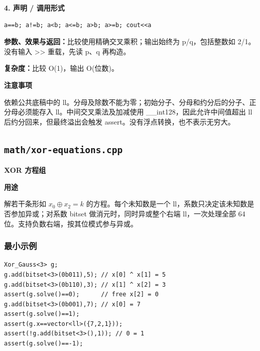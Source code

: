 \documentclass[UTF8,a4paper,10pt]{ctexart}
\newcommand{\TemplUsage}[1]{\textbf{用途}\par #1\par}
\newcommand{\TemplNote}[1]{\textbf{注意事项}\par #1\par}
\begin{document}
\noindent\begin{minipage}{\textwidth}
\textbf{4. 声明 / 调用形式}
\begin{lstlisting}
a==b; a!=b; a<b; a<=b; a>b; a>=b; cout<<a
\end{lstlisting}
\textbf{参数、效果与返回：}比较使用精确交叉乘积；输出始终为 p/q，包括整数如 2/1。没有输入 >> 重载，先读 p、q 再构造。

\textbf{复杂度：}比较 O(1)，输出 O(位数)。

\TemplNote{依赖公共底稿中的 ll。分母及除数不能为零；初始分子、分母和约分后的分子、正分母必须能存入 ll。中间交叉乘法及加减使用 \_\_int128，因此允许中间值超出 ll 后约分回来，但最终溢出会触发 assert。没有浮点转换，也不表示无穷大。}
\end{minipage}\par\vspace{0.4em}
\clearpage
\subsection{\texttt{math/xor-equations.cpp}}
\textbf{XOR 方程组}\par
\TemplUsage{解若干条形如 $x_0\mathbin{\oplus}x_2=k$ 的方程。每个未知数是一个 ll，系数只决定该未知数是否参加异或；对系数 bitset 做消元时，同时异或整个右端 ll，一次处理全部 64 位。支持负数右端，按其位模式参与异或。}
\subsubsection*{最小示例}
\begin{lstlisting}
Xor_Gauss<3> g;
g.add(bitset<3>(0b011),5); // x[0] ^ x[1] = 5
g.add(bitset<3>(0b110),3); // x[1] ^ x[2] = 3
assert(g.solve()==0);      // free x[2] = 0
g.add(bitset<3>(0b001),7); // x[0] = 7
assert(g.solve()==1);
assert(g.x==vector<ll>({7,2,1}));
assert(!g.add(bitset<3>(),1)); // 0 = 1
assert(g.solve()==-1);
\end{lstlisting}
\end{document}
